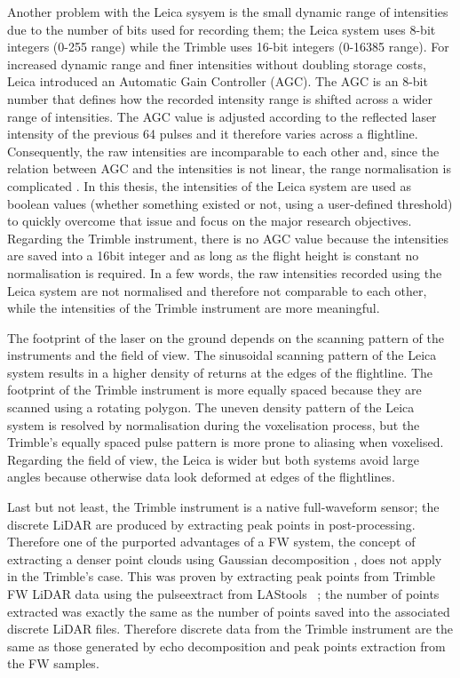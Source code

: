 \documentclass{subfiles}
\begin{document}
	\par Another problem with the Leica sysyem is the small dynamic range of intensities due to the number of bits used for recording them; the Leica system uses 8-bit integers (0-255 range) while the Trimble uses 16-bit integers (0-16385 range). For increased dynamic range and finer intensities without doubling storage costs, Leica introduced an Automatic Gain Controller (AGC). The AGC is an 8-bit number that defines how the recorded intensity range is shifted across a wider range of intensities. The AGC value is adjusted according to the reflected laser intensity of the previous 64 pulses and it therefore varies across a flightline. Consequently, the raw intensities are incomparable to each other and, since the relation between AGC and the intensities is not linear, the range normalisation is complicated \cite{Lehner2011}\cite{Korpela2010}. In this thesis, the intensities of the Leica system are used as boolean values (whether something existed or not, using a user-defined threshold) to quickly overcome that issue and focus on the major research objectives. Regarding the Trimble instrument, there is no AGC value because the intensities are saved into a 16bit integer and as long as the flight height is constant no normalisation is required. In a few words, the raw intensities recorded using the Leica system are not normalised and therefore not comparable to each other, while the intensities of the Trimble instrument are more meaningful. 
	
	\par The footprint of the laser on the ground depends on the scanning pattern of the instruments and the field of view. The sinusoidal scanning pattern of the Leica system results in a higher density of returns at the edges of the flightline. The footprint of the Trimble instrument is more equally spaced because they are scanned using a rotating polygon. The uneven density pattern of the Leica system is resolved by normalisation during the voxelisation process, but the Trimble's equally spaced pulse pattern is more prone to aliasing when voxelised. Regarding the field of view, the Leica is wider but both systems avoid large angles because otherwise data look deformed at edges of the flightlines. 
	
	\par Last but not least, the Trimble instrument is a native full-waveform sensor; the discrete LiDAR are produced by extracting peak points in post-processing. Therefore one of the purported advantages of a FW system, the concept of extracting a denser point clouds using Gaussian decomposition \cite{Wanger2004}, does not apply in the Trimble's case.  This was proven by extracting peak points from Trimble FW LiDAR data using the pulseextract from LAStools ~\cite{LAStools}; the number of points extracted was exactly the same as the number of points saved into the associated discrete LiDAR files. Therefore discrete data from the Trimble instrument are the same as those generated by echo decomposition and peak points extraction from the FW samples. 
	
\end{document}
